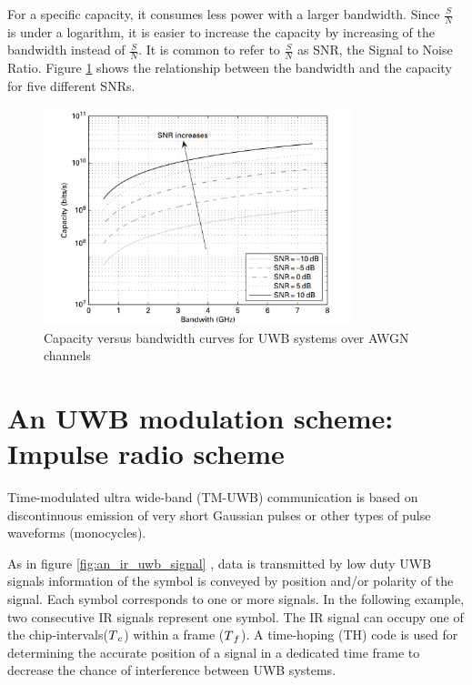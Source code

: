 \documentclass[\main/main.tex]{subfiles}
\begin{document}
For a specific capacity, it consumes less power with a larger bandwidth. Since $\frac{S}{N}$ is under a logarithm, it is easier to increase the capacity by increasing of the bandwidth instead of $\frac{S}{N}$. It is common to refer to $\frac{S}{N}$ as SNR, the Signal to Noise Ratio. Figure \ref{fig:capacity_versus_bandwidth_curves_for_uwb_systems_over_awgn_channels} \cite{ultra_wideband_positioning_systems} shows the relationship between the bandwidth and the capacity for five different SNRs.

\begin{figure}[H]
    \centering
    \includegraphics[width=0.8\textwidth]{capacity_versus_bandwidth_curves_for_uwb_systems_over_awgn_channels}
    \caption{Capacity versus bandwidth curves for UWB systems over AWGN channels}
    \label{fig:capacity_versus_bandwidth_curves_for_uwb_systems_over_awgn_channels}
\end{figure}

\section{An UWB modulation scheme: Impulse radio scheme}

Time-modulated ultra wide-band (TM-UWB) communication is based on discontinuous emission of very short Gaussian pulses or other types of pulse waveforms (monocycles).

As in figure \ref{fig:an_ir_uwb_signal} \cite{ultra_wideband_positioning_systems}, data is transmitted by low duty UWB signals information of the symbol is conveyed by position and/or polarity of the signal. Each symbol corresponds to one or more signals. In the following example, two consecutive IR signals represent one symbol. The IR signal can occupy one of the chip-intervals($T\textsubscript{$c$}$) within a frame ($T\textsubscript{$f$}$). A time-hoping (TH) code is used for determining the accurate position of a signal in a dedicated time frame to decrease the chance of interference between UWB systems. 
\end{document}
